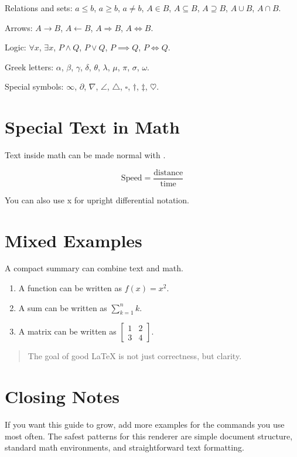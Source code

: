 \documentclass{article}
\begin{document}
Relations and sets: $a\leq b$, $a\geq b$, $a\neq b$, $A \in B$, $A \subseteq B$, $A \supseteq B$, $A \cup B$, $A \cap B$.

Arrows: $A \to B$, $A \leftarrow B$, $A \Rightarrow B$, $A \Leftrightarrow B$.

Logic: $\forall x$, $\exists x$, $P \land Q$, $P \lor Q$, $P \implies Q$, $P \iff Q$.

Greek letters: $\alpha$, $\beta$, $\gamma$, $\delta$, $\theta$, $\lambda$, $\mu$, $\pi$, $\sigma$, $\omega$.

Special symbols: $\infty$, $\partial$, $\nabla$, $\angle$, $\triangle$, $\square$, $\dagger$, $\ddagger$, $\heartsuit$.

\section{Special Text in Math}
Text inside math can be made normal with \texttt{\text{}}.

\[
\text{Speed} = \frac{\text{distance}}{\text{time}}
\]

You can also use x for upright differential notation.

\section{Mixed Examples}
A compact summary can combine text and math.

\begin{enumerate}
  \item A function can be written as $f(x)=x^2$.
  \item A sum can be written as $\sum_{k=1}^{n} k$.
  \item A matrix can be written as $\begin{bmatrix}1 & 2 \\ 3 & 4\end{bmatrix}$.
\end{enumerate}

\begin{quote}
The goal of good LaTeX is not just correctness, but clarity.
\end{quote}

\section{Closing Notes}
If you want this guide to grow, add more examples for the commands you use most often. The safest patterns for this renderer are simple document structure, standard math environments, and straightforward text formatting.
\end{document}
